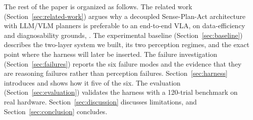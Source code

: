 The rest of the paper is organized as follows. The related work
(Section~\ref{sec:related-work}) argues why a decoupled Sense-Plan-Act
architecture with LLM/VLM planners is preferable to an end-to-end VLA,
on data-efficiency and diagnosability grounds, . The experimental
baseline (Section~\ref{sec:baseline}) describes the two-layer system
we built, its two perception regimes, and the exact point where the
harness will later be inserted. The failure investigation
(Section~\ref{sec:failures}) reports the six failure modes and the
evidence that they are reasoning failures rather than perception
failures. Section~\ref{sec:harness} introduces \harness{} and shows how
it  five of the six. The evaluation
(Section~\ref{sec:evaluation}) validates the harness with a 120-trial
benchmark on real hardware. Section~\ref{sec:discussion} discusses
limitations, and Section~\ref{sec:conclusion} concludes.
